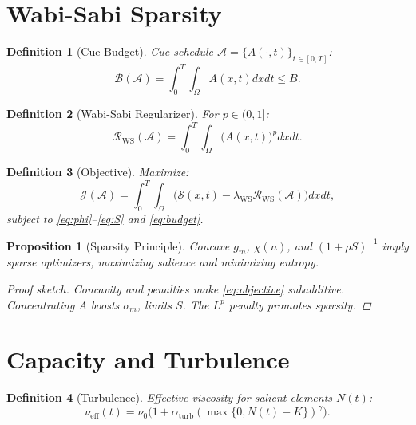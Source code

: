 \documentclass[openany]{book}
\newtheorem{definition}{Definition}[chapter]
\newtheorem{proposition}{Proposition}[chapter]
\newcommand{\Sent}{S} %
\begin{document}
{{\section{Wabi-Sabi Sparsity}
\label{sec:rsvp-wabisabi}
\begin{definition}[Cue Budget]
\label{def:budget}
Cue schedule \(\mathcal{A} = \{A(\cdot,t)\}_{t \in [0,T]}\):
\begin{equation}
\label{eq:budget}
\mathcal{B}(\mathcal{A}) = \int_{0}^{T} \int_{\Omega} A(x,t) dx dt \leq B.
\end{equation}
\end{definition}

\begin{definition}[Wabi-Sabi Regularizer]
\label{def:ws}
For \(p \in (0,1]\):
\begin{equation}
\label{eq:ws-reg}
\mathcal{R}_{\mathrm{WS}}(\mathcal{A}) = \int_{0}^{T} \int_{\Omega} \big(A(x,t)\big)^p dx dt.
\end{equation}
\end{definition}

\begin{definition}[Objective]
\label{def:objective}
Maximize:
\begin{equation}
\label{eq:objective}
\mathcal{J}(\mathcal{A}) = \int_{0}^{T} \int_{\Omega} \Big(\mathcal{S}(x,t) - \lambda_{\mathrm{WS}} \mathcal{R}_{\mathrm{WS}}(\mathcal{A})\Big) dx dt,
\end{equation}
subject to \eqref{eq:phi}--\eqref{eq:S} and \eqref{eq:budget}.
\end{definition}

\begin{proposition}[Sparsity Principle]
\label{prop:sparsity}
Concave \(g_m\), \(\chi(n)\), and \((1 + \rho \Sent)^{-1}\) imply sparse optimizers, maximizing salience and minimizing entropy.
\begin{proof}[Proof sketch]
Concavity and penalties make \eqref{eq:objective} subadditive. Concentrating \(A\) boosts \(\sigma_{m}\), limits \(\Sent\). The \(L^p\) penalty promotes sparsity.
\end{proof}
\end{proposition}

\section{Capacity and Turbulence}
\label{sec:rsvp-turbulence}
\begin{definition}[Turbulence]
\label{def:turbulence}
Effective viscosity for salient elements \(N(t)\):
\begin{equation}
\label{eq:visc}
\nu_{\mathrm{eff}}(t) = \nu_0 \big(1 + \alpha_{\mathrm{turb}} (\max\{0, N(t) - K\})^\gamma \big).
\end{equation}
\end{definition}

}}
\end{document}
